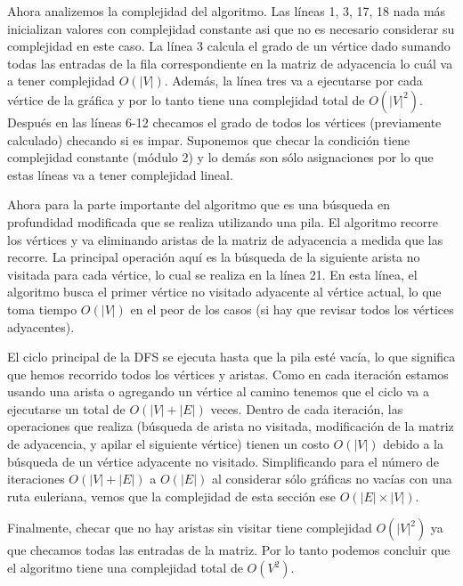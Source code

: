 \documentclass[11pt]{article}
\begin{document}
Ahora analizemos la complejidad del algoritmo. Las líneas 1, 3, 17, 18 nada más
inicializan valores con complejidad constante asi que no es necesario considerar
su complejidad en este caso. La línea 3 calcula el grado de un vértice dado
sumando todas las entradas de la fila correspondiente en la matriz de adyacencia
lo cuál va a tener complejidad $O(|V|)$. Además, la línea tres va a ejecutarse
por cada vértice de la gráfica y por lo tanto tiene una complejidad total de
$O(|V|^2)$. Después en las líneas 6-12 checamos el grado de todos los vértices
(previamente calculado) checando si es impar. Suponemos que checar la condición
tiene complejidad constante (módulo 2) y lo demás son sólo asignaciones por lo
que estas líneas va a tener complejidad lineal.
    
Ahora para la parte importante del algoritmo que es una búsqueda en profundidad
modificada que se realiza utilizando una pila. El algoritmo recorre los vértices
y va eliminando aristas de la matriz de adyacencia a medida que las recorre. La
principal operación aquí es la búsqueda de la siguiente arista no visitada para
cada vértice, lo cual se realiza en la línea 21. En esta línea, el algoritmo
busca el primer vértice no visitado adyacente al vértice actual, lo que toma
tiempo $O(|V|)$ en el peor de los casos (si hay que revisar todos los vértices
adyacentes).

El ciclo principal de la DFS se ejecuta hasta que la pila esté vacía, lo que
significa que hemos recorrido todos los vértices y aristas. Como en cada
iteración estamos usando una arista o agregando un vértice al camino tenemos que
el ciclo va a ejecutarse un total de $O(|V| + |E|)$ veces. Dentro de cada
iteración, las operaciones que realiza (búsqueda de arista no visitada,
modificación de la matriz de adyacencia, y apilar el siguiente vértice) tienen
un costo $O(|V|)$ debido a la búsqueda de un vértice adyacente no visitado.
Simplificando para el número de iteraciones $O(|V| + |E|)$ a $O(|E|)$ al
considerar sólo gráficas no vacías con una ruta euleriana, vemos que la complejidad
de esta sección ese $O(|E| \times |V|)$.

Finalmente, checar que no hay aristas sin visitar tiene complejidad $O(|V|^2)$ ya que
checamos todas las entradas de la matriz. Por lo tanto podemos concluir que el algoritmo
tiene una complejidad total de $O(V^2)$.
\end{document}
